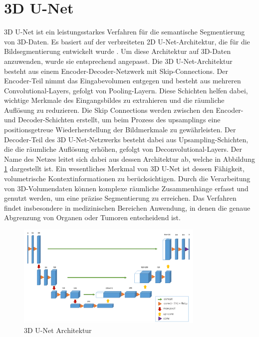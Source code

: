 \section{3D U-Net}

3D U-Net ist ein leistungsstarkes Verfahren für die semantische Segmentierung von 3D-Daten.
Es basiert auf der verbreiteten 2D U-Net-Architektur, die für die Bildsegmentierung entwickelt wurde \cite{ronneberger2015unet}.
Um diese Architektur auf 3D-Daten anzuwenden, wurde sie entsprechend angepasst.
Die 3D U-Net-Architektur besteht aus einem Encoder-Decoder-Netzwerk mit
Skip-Connections. Der Encoder-Teil nimmt das Eingabevolumen entgegen und
besteht aus mehreren Convolutional-Layers, gefolgt von Pooling-Layern. Diese
Schichten helfen dabei, wichtige Merkmale des Eingangsbildes zu extrahieren und
die räumliche Auflösung zu reduzieren. Die Skip Connections werden zwischen den
Encoder- und Decoder-Schichten erstellt, um beim Prozess des upsamplings eine
positionsgetreue Wiederherstellung der Bildmerkmale zu gewährleisten. Der
Decoder-Teil des 3D U-Net-Netzwerks besteht dabei aus Upsampling-Schichten, die
die räumliche Auflösung erhöhen, gefolgt von Deconvolutional-Layers. Der Name
des Netzes leitet sich dabei aus dessen Architektur ab, welche in Abbildung
\ref{fig:UNET} dargestellt ist. 
Ein wesentliches Merkmal von 3D U-Net ist dessen Fähigkeit, volumetrische
Kontextinformationen zu berücksichtigen. Durch die Verarbeitung von
3D-Volumendaten können komplexe räumliche Zusammenhänge erfasst und genutzt
werden, um eine präzise Segmentierung zu erreichen. Das Verfahren findet insbesondere in
medizinischen Bereichen Anwendung, in denen die genaue Abgrenzung
von Organen oder Tumoren entscheidend ist. \cite{cciccek20163d,987654321}\\

\begin{figure}[H]
    \centering
    \includegraphics[width=0.8\textwidth]{bilder/3D_U-Net.png}
    \captionsetup{font=small} %

    \caption[3D U-Net Architektur]{3D U-Net Architektur \cite{cciccek20163d}}
    \label{fig:UNET}
\end{figure}